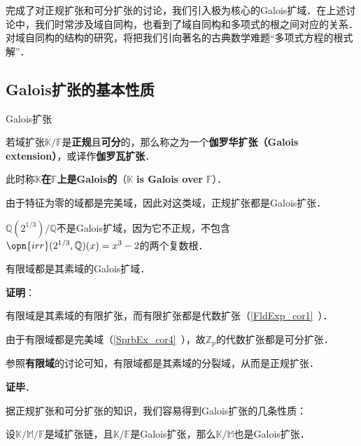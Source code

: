 


完成了对正规扩张和可分扩张的讨论，我们引入极为核心的Galois扩域．在上述讨论中，我们时常涉及域自同构，也看到了域自同构和多项式的根之间对应的关系．对域自同构的结构的研究，将把我们引向著名的古典数学难题“多项式方程的根式解”．



\subsection{Galois扩张的基本性质}

\begin{definition}{Galois扩张}

若域扩张$\mathbb{K}/\mathbb{F}$是\textbf{正规}且\textbf{可分}的，那么称之为一个\textbf{伽罗华扩张（Galois extension）}，或译作\textbf{伽罗瓦扩张}．

此时称$\mathbb{K}$\textbf{在}$\mathbb{F}$\textbf{上是Galois的}（$\mathbb{K}$ \textbf{is Galois over} $\mathbb{F}$）．

\end{definition}

由于特征为零的域都是完美域，因此对这类域，正规扩张都是Galois扩张．

\begin{example}{}
$\mathbb{Q}(2^{1/3})/\mathbb{Q}$不是Galois扩域，因为它不正规，不包含$\opn{irr}(2^{1/3}, \mathbb{Q})(x)=x^3-2$的两个复数根．
\end{example}

\begin{theorem}{}
有限域都是其素域的Galois扩域．
\end{theorem}

\textbf{证明}：

有限域是其素域的有限扩张，而有限扩张都是代数扩张（\autoref{FldExp_cor1}~）．

由于有限域都是完美域（\autoref{SprbEx_cor4}~），故$\mathbb{Z}_p$的代数扩张都是可分扩张．

参照\textbf{有限域}的讨论可知，有限域都是其素域的分裂域，从而是正规扩张．

\textbf{证毕}．


据正规扩张和可分扩张的知识，我们容易得到Galois扩张的几条性质：


\begin{theorem}{}\label{GExt_the6}
设$\mathbb{K}/\mathbb{M}/\mathbb{F}$是域扩张链，且$\mathbb{K}/\mathbb{F}$是Galois扩张，那么$\mathbb{K}/\mathbb{M}$也是Galois扩张．
\end{theorem}

